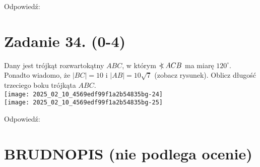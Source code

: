 \documentclass[10pt]{article}
\newcommand\Varangle{\mathop{{<\!\!\!\!\!\text{\small)}}\:}\nolimits}
\begin{document}
Odpowiedź:

\section*{Zadanie 34. (0-4)}
Dany jest trójkąt rozwartokątny \(A B C\), w którym \(\Varangle A C B\) ma miarę \(120^{\circ}\). Ponadto wiadomo, że \(|B C|=10\) i \(|A B|=10 \sqrt{7}\) (zobacz rysunek). Oblicz długość trzeciego boku trójkąta \(A B C\).\\
\texttt{[image: 2025\_02\_10\_4569edf99f1a2b54835bg-24]}\\
\texttt{[image: 2025\_02\_10\_4569edf99f1a2b54835bg-25]}

Odpowiedź:

\section*{BRUDNOPIS (nie podlega ocenie)}
\end{document}
